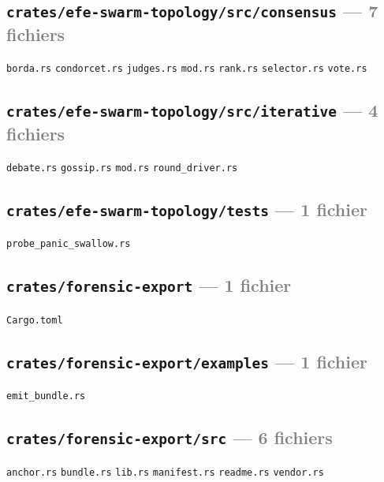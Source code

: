 \documentclass[10pt]{report}
\newcommand{\code}[1]{\texttt{\small #1}}
\begin{document}
\subsection*{\code{crates/efe-swarm-topology/src/consensus} \normalfont\textcolor{grey}{--- 7 fichiers}}
\begin{sloppypar}\footnotesize\raggedright
\code{borda.rs} \;\textbullet\; \code{condorcet.rs} \;\textbullet\; \code{judges.rs} \;\textbullet\; \code{mod.rs} \;\textbullet\; \code{rank.rs} \;\textbullet\; \code{selector.rs} \;\textbullet\; \code{vote.rs}
\end{sloppypar}

\subsection*{\code{crates/efe-swarm-topology/src/iterative} \normalfont\textcolor{grey}{--- 4 fichiers}}
\begin{sloppypar}\footnotesize\raggedright
\code{debate.rs} \;\textbullet\; \code{gossip.rs} \;\textbullet\; \code{mod.rs} \;\textbullet\; \code{round\_driver.rs}
\end{sloppypar}

\subsection*{\code{crates/efe-swarm-topology/tests} \normalfont\textcolor{grey}{--- 1 fichier}}
\begin{sloppypar}\footnotesize\raggedright
\code{probe\_panic\_swallow.rs}
\end{sloppypar}

\subsection*{\code{crates/forensic-export} \normalfont\textcolor{grey}{--- 1 fichier}}
\begin{sloppypar}\footnotesize\raggedright
\code{Cargo.toml}
\end{sloppypar}

\subsection*{\code{crates/forensic-export/examples} \normalfont\textcolor{grey}{--- 1 fichier}}
\begin{sloppypar}\footnotesize\raggedright
\code{emit\_bundle.rs}
\end{sloppypar}

\subsection*{\code{crates/forensic-export/src} \normalfont\textcolor{grey}{--- 6 fichiers}}
\begin{sloppypar}\footnotesize\raggedright
\code{anchor.rs} \;\textbullet\; \code{bundle.rs} \;\textbullet\; \code{lib.rs} \;\textbullet\; \code{manifest.rs} \;\textbullet\; \code{readme.rs} \;\textbullet\; \code{vendor.rs}
\end{sloppypar}
\end{document}
